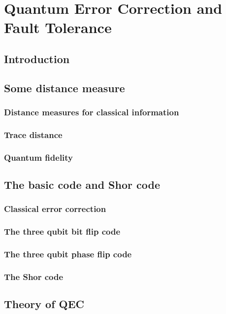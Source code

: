 \chapter{Quantum Error Correction and Fault Tolerance}
\section{Introduction}


\section{Some distance measure}
\subsection{Distance measures for classical information}

\subsection{Trace distance}

\subsection{Quantum fidelity}

\section{The basic code and Shor code}
\subsection{Classical error correction}

\subsection{The three qubit bit flip code}

\subsection{The three qubit phase flip code}

\subsection{The Shor code}


\section{Theory of QEC}

